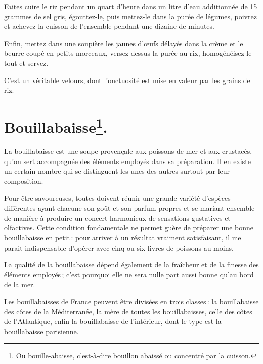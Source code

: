 Faites cuire le riz pendant un quart d'heure dans un litre d'eau additionnée de
15 grammes de sel gris, égouttez-le, puis mettez-le dans la purée de légumes,
poivrez et achevez la cuisson de l'ensemble pendant une dizaine de minutes.

Enfin, mettez dans une soupière les jaunes d'œufs délayés dans la crème et le
beurre coupé en petits morceaux, versez dessus la purée au rix, homogénéisez le
tout et servez.

C'est un véritable velours, dont l'onctuosité est mise en valeur par les grains
de riz.

\section*{\centering Bouillabaisse\footnote{Ou bouille-abaisse, c'est-à-dire 
                                            bouillon abaissé ou concentré par la 
                                            cuisson.}.}

La bouillabaisse est une soupe provençale aux poissons de mer et aux crustacés,
qu'on sert accompagnée des éléments employés dans sa préparation. Il en existe
un certain nombre qui se distinguent les unes des autres surtout par leur
composition.

Pour être savoureuses, toutes doivent réunir une grande variété d'espèces
différentes ayant chacune son goût et son parfum propres et se mariant ensemble
de manière à produire un concert harmonieux de sensations gustatives et
olfactives. Cette condition fondamentale ne permet guère de préparer une bonne
bouillabaisse en petit : pour arriver à un résultat vraiment satisfaisant, il
me parait indispensable d'opérer avec cinq ou six livres de poissons au moins.

La qualité de la bouillabaisse dépend également de la fraîcheur et de la
finesse des éléments employés ; c'est pourquoi elle ne sera nulle part aussi
bonne qu'au bord de la mer.

Les bouillabaisses de France peuvent être divisées en trois classes : la
bouillabaisse des côtes de la Méditerranée, la mère de toutes les
bouillabaisses, celle des côtes de l'Atlantique, enfin la bouillabaisse de
l'intérieur, dont le type est la bouillabaisse parisienne.

\sk

